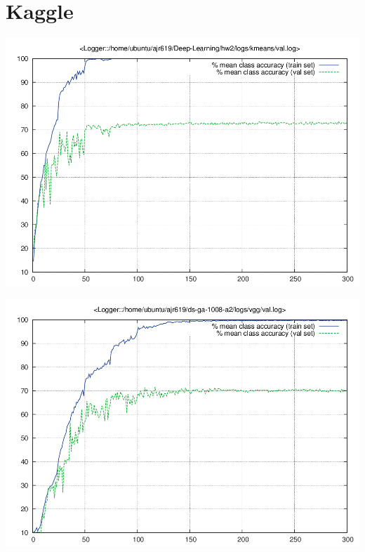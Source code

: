 \documentclass{article}
\begin{document}
\section{Kaggle}

\begin{centering}
\includegraphics[scale=0.3]{images/kmeans/val.png}
\end{centering}

\begin{centering}
\includegraphics[scale=0.3]{images/kmeans.1/val.png}
\end{centering}
\end{document}
